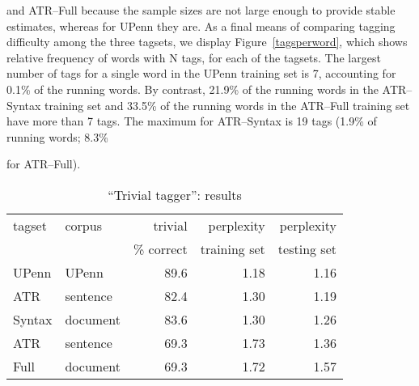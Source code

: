 \noindent and ATR--Full because the sample sizes are not large
enough to provide stable estimates, whereas for UPenn they are. As a
final means of comparing tagging difficulty among the three tagsets,
we display Figure~\ref{tagsperword}, which shows relative frequency of
words with N tags, for each of the tagsets.  The largest number of
tags for a single word in the UPenn training set is 7, accounting for
0.1\% of the running words. By contrast, 21.9\% of the running words
in the ATR--Syntax training set and 33.5\% of the running words in the
ATR--Full training set have more\hspace{0.15mm} than\hspace{0.15mm} 7\hspace{0.15mm} tags.\hspace{0.15mm}  The\hspace{0.15mm} maximum\hspace{0.15mm} for\hspace{0.15mm}
ATR--Syntax\hspace{0.15mm} is\hspace{0.15mm} 19\hspace{0.15mm} tags\hspace{0.15mm} (1.9\%\hspace{0.15mm} of\hspace{0.15mm} running\hspace{0.15mm} words; 8.3\%

\noindent for ATR--Full).

\begin{table}
\begin{center}
\caption{``Trivial tagger'': results}
\renewcommand{\arraystretch}{}
\begin{tabular}{||l|l|*{3}{r|}|}
\hline
tagset      & corpus     & trivial     & perplexity      & perplexity   \\
            &            & \% correct  & training set    & testing set \\ \hline
UPenn       & UPenn      & 89.6         & 1.18         & 1.16    \\ \hline

ATR         & sentence   & 82.4         & 1.30         & 1.19    \\ \cline{2-5}
Syntax      & document   & 83.6         & 1.30         & 1.26    \\ \hline

ATR         & sentence   & 69.3         & 1.73         & 1.36    \\ \cline{2-5}
Full        & document   & 69.3         & 1.72         & 1.57    \\ \hline
\end{tabular}
\renewcommand{\arraystretch}{}
\label{perplexity.table}
\end{center}
\end{table}



